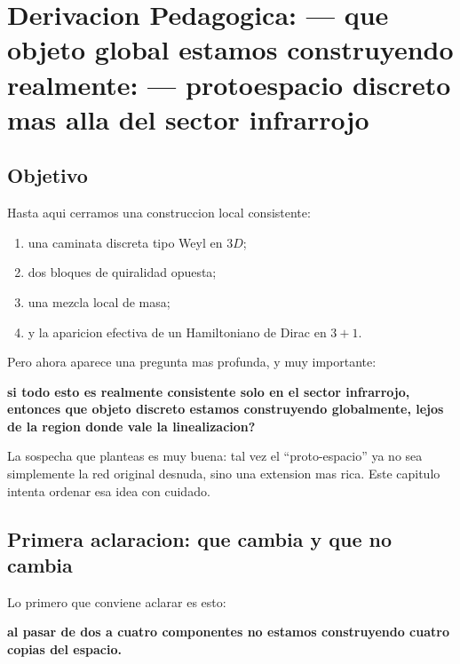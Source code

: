 \chapter{Derivacion Pedagogica: --- que objeto global estamos construyendo realmente: --- protoespacio discreto mas alla del sector infrarrojo}
\label{ch:protoespacio-global-qw-dirac-3p1}







\section{Objetivo}
Hasta aqui cerramos una construccion local consistente:
\begin{enumerate}[label=\arabic*.]
    \item una caminata discreta tipo Weyl en \(3D\);
    \item dos bloques de quiralidad opuesta;
    \item una mezcla local de masa;
    \item y la aparicion efectiva de un Hamiltoniano de Dirac en \(3+1\).
\end{enumerate}

Pero ahora aparece una pregunta mas profunda, y muy importante:
\begin{displayquote}
\textbf{si todo esto es realmente consistente solo en el sector infrarrojo, entonces que objeto discreto estamos construyendo globalmente, lejos de la region donde vale la linealizacion?}
\end{displayquote}

La sospecha que planteas es muy buena: tal vez el \enquote{proto-espacio} ya no sea simplemente la red original desnuda, sino una extension mas rica. Este capitulo intenta ordenar esa idea con cuidado.

\section{Primera aclaracion: que cambia y que no cambia}
Lo primero que conviene aclarar es esto:
\begin{displayquote}
\textbf{al pasar de dos a cuatro componentes no estamos construyendo cuatro copias del espacio.}
\end{displayquote}

